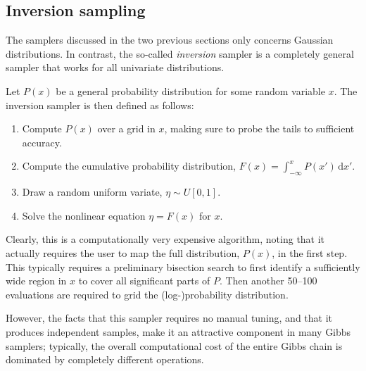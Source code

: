 \documentclass[onecolumn]{aa}
\newcommand{\x}[0]{\vec{x}}
\begin{document}



\subsection{Inversion sampling}
\label{sec:inversion}

The samplers discussed in the two previous sections only concerns
Gaussian distributions. In contrast, the so-called \emph{inversion}
sampler is a completely general sampler that works for all univariate
distributions. 

Let $P(x)$ be a general probability distribution for some random
variable $x$. The inversion sampler is then defined as follows:
\begin{enumerate}
  \item Compute $P(x)$ over a grid in $x$, making sure to probe the
    tails to sufficient accuracy.
  \item Compute the cumulative probability distribution, ${F(x) =
    \int_{-\infty}^{x} P(x')\,\mathrm dx'}$.
  \item Draw a random uniform variate, $\eta \sim U[0,1]$.
  \item Solve the nonlinear equation $\eta = F(x)$ for $x$.
\end{enumerate}

Clearly, this is a computationally very expensive algorithm, noting
that it actually requires the user to map the full distribution,
$P(x)$, in the first step. This typically requires a preliminary
bisection search to first identify a sufficiently wide region in $x$
to cover all significant parts of $P$. Then another 50--100
evaluations are required to grid the (log-)probability
distribution. 

However, the facts that this sampler requires no manual tuning, and
that it produces independent samples, make it an attractive component
in many Gibbs samplers; typically, the overall computational cost of
the entire Gibbs chain is dominated by completely different operations.
\end{document}
